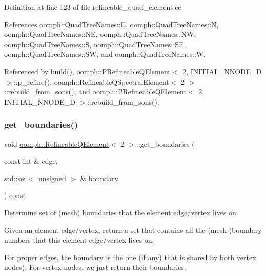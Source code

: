 Definition at line 123 of file refineable\+\_\+quad\+\_\+element.\+cc.



References oomph\+::\+Quad\+Tree\+Names\+::E, oomph\+::\+Quad\+Tree\+Names\+::N, oomph\+::\+Quad\+Tree\+Names\+::\+NE, oomph\+::\+Quad\+Tree\+Names\+::\+NW, oomph\+::\+Quad\+Tree\+Names\+::S, oomph\+::\+Quad\+Tree\+Names\+::\+SE, oomph\+::\+Quad\+Tree\+Names\+::\+SW, and oomph\+::\+Quad\+Tree\+Names\+::W.



Referenced by build(), oomph\+::\+P\+Refineable\+Q\+Element$<$ 2, I\+N\+I\+T\+I\+A\+L\+\_\+\+N\+N\+O\+D\+E\+\_\+D $>$\+::p\+\_\+refine(), oomph\+::\+Refineable\+Q\+Spectral\+Element$<$ 2 $>$\+::rebuild\+\_\+from\+\_\+sons(), and oomph\+::\+P\+Refineable\+Q\+Element$<$ 2, I\+N\+I\+T\+I\+A\+L\+\_\+\+N\+N\+O\+D\+E\+\_\+D $>$\+::rebuild\+\_\+from\+\_\+sons().

\mbox{\label{classoomph_1_1RefineableQElement_3_012_01_4_a739ecb3d2eff4c9d08efa79a39d387b0}} 
\subsubsection{\texorpdfstring{get\+\_\+boundaries()}{get\_boundaries()}}
{\footnotesize\ttfamily void \hyperlink{classoomph_1_1RefineableQElement}{oomph\+::\+Refineable\+Q\+Element}$<$ 2 $>$\+::get\+\_\+boundaries (\begin{DoxyParamCaption}\item[{const int \&}]{edge,  }\item[{std\+::set$<$ unsigned $>$ \&}]{boundary }\end{DoxyParamCaption}) const}



Determine set of (mesh) boundaries that the element edge/vertex lives on. 

Given an element edge/vertex, return a set that contains all the (mesh-\/)boundary numbers that this element edge/vertex lives on.

For proper edges, the boundary is the one (if any) that is shared by both vertex nodes). For vertex nodes, we just return their boundaries. 

